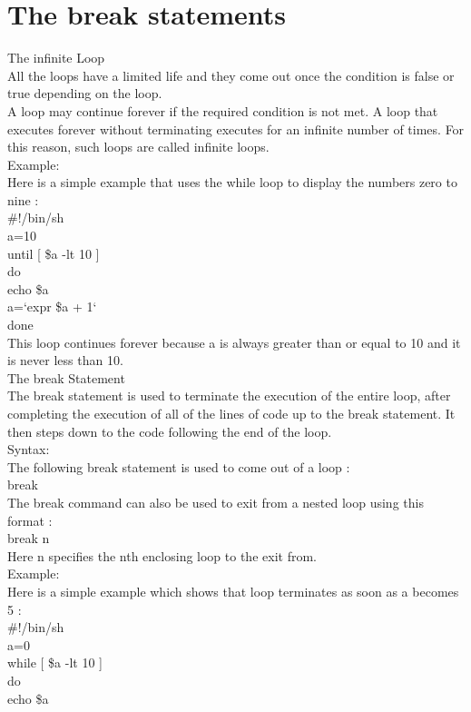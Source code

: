 \documentclass{article}
\begin{document}
\section*{The break statements}
The infinite Loop\\
All the loops have a limited life and they come out once the condition is false or true depending on the loop.\\
A loop may continue forever if the required condition is not met. A loop that executes forever without terminating executes for an infinite number of times. For this reason, such loops are called infinite loops.\\
Example:\\
Here is a simple example that uses the while loop to display the numbers zero to nine :\\
\#!/bin/sh\\
a=10\\
until [ \$a -lt 10 ]\\
do\\
   echo \$a\\
   a=`expr \$a + 1`\\
done\\
This loop continues forever because a is always greater than or equal to 10 and it is never less than 10.\\
The break Statement\\
The break statement is used to terminate the execution of the entire loop, after completing the execution of all of the lines of code up to the break statement. It then steps down to the code following the end of the loop.\\
Syntax:\\
The following break statement is used to come out of a loop :\\
break\\
The break command can also be used to exit from a nested loop using this format :\\
break n\\
Here n specifies the nth enclosing loop to the exit from.\\
Example:\\
Here is a simple example which shows that loop terminates as soon as a becomes 5 :\\
\#!/bin/sh\\
a=0\\
while [ \$a -lt 10 ]\\
do\\
   echo \$a\\
\end{document}
